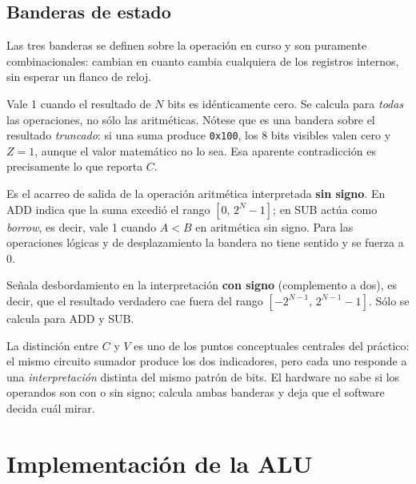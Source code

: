 \documentclass[12pt,a4paper]{article}
\begin{document}
\subsection{Banderas de estado}

Las tres banderas se definen sobre la operación en curso y son puramente combinacionales:
cambian en cuanto cambia cualquiera de los registros internos, sin esperar un flanco de
reloj.

\begin{description}[leftmargin=2.2em,style=nextline]
  \item[\texttt{o\_zero} ($Z$)] Vale 1 cuando el resultado de $N$ bits es idénticamente
        cero. Se calcula para \emph{todas} las operaciones, no sólo las aritméticas.
        Nótese que es una bandera sobre el resultado \emph{truncado}: si una suma produce
        \texttt{0x100}, los 8 bits visibles valen cero y $Z=1$, aunque el valor matemático
        no lo sea. Esa aparente contradicción es precisamente lo que reporta $C$.
  \item[\texttt{o\_carry} ($C$)] Es el acarreo de salida de la operación aritmética
        interpretada \textbf{sin signo}. En ADD indica que la suma excedió el rango
        $[0,\,2^N-1]$; en SUB actúa como \textit{borrow}, es decir, vale 1 cuando
        $A < B$ en aritmética sin signo. Para las operaciones lógicas y de desplazamiento
        la bandera no tiene sentido y se fuerza a 0.
  \item[\texttt{o\_overflow} ($V$)] Señala desbordamiento en la interpretación
        \textbf{con signo} (complemento a dos), es decir, que el resultado verdadero cae
        fuera del rango $[-2^{N-1},\,2^{N-1}-1]$. Sólo se calcula para ADD y SUB.
\end{description}

La distinción entre $C$ y $V$ es uno de los puntos conceptuales centrales del práctico: el
mismo circuito sumador produce los dos indicadores, pero cada uno responde a una
\emph{interpretación} distinta del mismo patrón de bits. El hardware no sabe si los
operandos son con o sin signo; calcula ambas banderas y deja que el software decida cuál
mirar.

\section{Implementación de la ALU}
\label{sec:impl}
\end{document}
